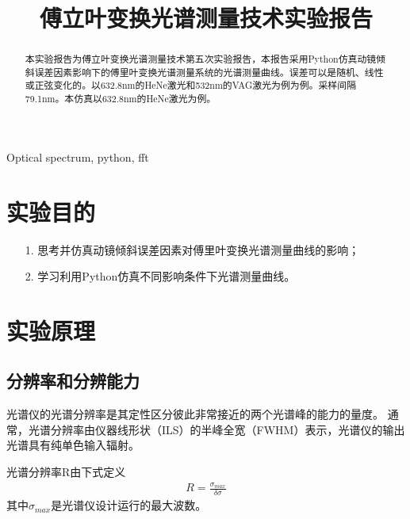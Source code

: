 \documentclass[conference]{IEEEtran}
\begin{document}
\title{傅立叶变换光谱测量技术实验报告}

\author{
}




\maketitle

\begin{abstract}
    本实验报告为傅立叶变换光谱测量技术第五次实验报告，本报告采用Python仿真动镜倾斜误差因素影响下的傅里叶变换光谱测量系统的光谱测量曲线。误差可以是随机、线性或正弦变化的。以632.8nm的HeNe激光和532nm的VAG激光为例为例。采样间隔79.1nm。本仿真以632.8nm的HeNe激光为例。
\end{abstract}

\begin{IEEEkeywords}
    Optical spectrum, python, fft
\end{IEEEkeywords}

\section{实验目的}
\begin{itemize}
    \item[1.] 思考并仿真动镜倾斜误差因素对傅里叶变换光谱测量曲线的影响；
    \item[2.] 学习利用Python仿真不同影响条件下光谱测量曲线。 
\end{itemize} 

\section{实验原理}
\subsection{分辨率和分辨能力}
光谱仪的光谱分辨率是其定性区分彼此非常接近的两个光谱峰的能力的量度。 通常，光谱分辨率由仪器线形状（ILS）的半峰全宽（FWHM）表示，光谱仪的输出光谱具有纯单色输入辐射。

光谱分辨率R由下式定义
\begin{align}
    R = \frac{\sigma_{max}}{\delta \sigma}
\end{align}
其中$\sigma_{max}$是光谱仪设计运行的最大波数。
\end{document}
